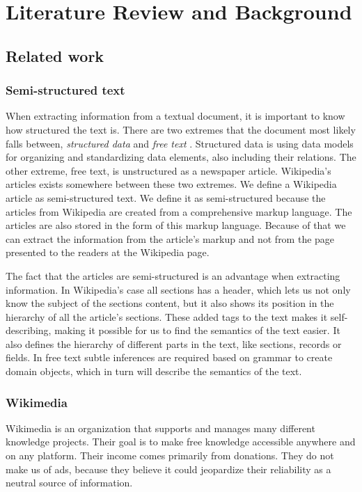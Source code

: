 
\chapter{Literature Review and Background} \label{cap_2}

\section{Related work}

\subsection{Semi-structured text}
When extracting information from a textual document, it is important to know how structured the text is. There are two extremes that the document most likely falls between, \textit{structured data} and \textit{free text}  \cite{semi-struc-text}. Structured data is using data models for organizing and standardizing data elements, also including their relations. The other extreme, free text, is unstructured as a newspaper article. Wikipedia's articles exists somewhere between these two extremes. We define a Wikipedia article as semi-structured text. We define it as semi-structured because the articles from Wikipedia are created from a comprehensive markup language. The articles are also stored in the form of this markup language. Because of that we can extract the information from the article's markup and not from the page presented to the readers at the Wikipedia page. 

The fact that the articles are semi-structured is an advantage when extracting information. In Wikipedia's case all sections has a header, which lets us not only know the subject of the sections content, but it also shows its position in the hierarchy of all the article's sections. These added tags to the text makes it self-describing, making it possible for us to find the semantics of the text easier. It also defines the hierarchy of different parts in the text, like sections, records or fields. In free text subtle inferences are required based on grammar to create domain objects, which in turn will describe the semantics of the text. 

\subsection{Wikimedia} \label{wikimedia}
Wikimedia \cite{wikimedia} is an organization that supports and manages many different knowledge projects. Their goal is to make free knowledge accessible anywhere and on any platform. Their income comes primarily from donations. They do not make us of ads, because they believe it could jeopardize their reliability as a neutral source of information.

